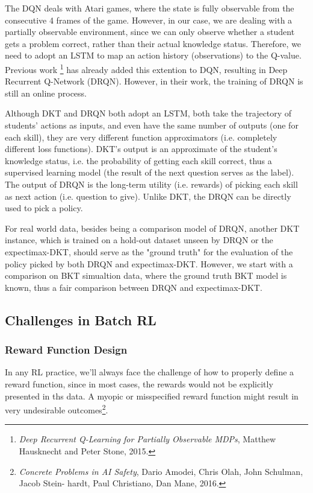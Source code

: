 The DQN deals with Atari games, where the state is fully observable from the consecutive 4 frames of the game. However, in our case, we are dealing with a partially observable environment, since we can only observe whether a student gets a problem correct, rather than their actual knowledge status. Therefore, we need to adopt an LSTM to map an action history (observations) to the Q-value. Previous work \footnote{\textit{Deep Recurrent Q-Learning for Partially Observable MDPs}, Matthew Hausknecht and Peter Stone, 2015.} has already added this extention to DQN, resulting in Deep Recurrent Q-Network (DRQN). However, in their work, the training of DRQN is still an online process.

Although DKT and DRQN both adopt an LSTM, both take the trajectory of students' actions as inputs, and even have the same number of outputs (one for each skill), they are very different function approximators (i.e. completely different loss functions). DKT's output is an approximate of the student's knowledge status, i.e. the probability of getting each skill correct, thus a supervised learning model (the result of the next question serves as the label). The output of DRQN is the long-term utility (i.e. rewards) of picking each skill as next action (i.e. question to give). Unlike DKT, the DRQN can be directly used to pick a policy. 

For real world data, besides being a comparison model of DRQN, another DKT instance, which is trained on a hold-out dataset unseen by DRQN or the expectimax-DKT, should serve as the "ground truth" for the evaluation of the policy picked by both DRQN and expectimax-DKT. However, we start with a comparison on BKT simualtion data, where the ground truth BKT model is known, thus a fair comparison between DRQN and expectimax-DKT.

\subsection{Challenges in Batch RL}

\subsubsection{Reward Function Design}

In any RL practice, we'll always face the challenge of how to properly define a reward function, since in most cases, the rewards would not be explicitly presented in ths data. A myopic or misspecified reward function might result in very undesirable outcomes\footnote{\textit{Concrete Problems in AI Safety}, Dario Amodei, Chris Olah, John Schulman, Jacob Stein- hardt, Paul Christiano, Dan Mane, 2016.}.

